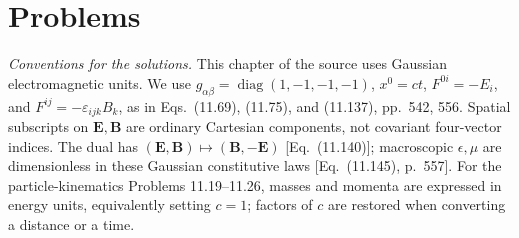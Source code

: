 
\section*{Problems}

\noindent\emph{Conventions for the solutions.} This chapter of the source
uses Gaussian electromagnetic units. We use
$g_{\alpha\beta}=\operatorname{diag}(1,-1,-1,-1)$,
$x^0=ct$, $F^{0i}=-E_i$, and $F^{ij}=-\varepsilon_{ijk}B_k$,
as in Eqs.~(11.69), (11.75), and (11.137), pp.~542, 556.
Spatial subscripts on $\mathbf E,\mathbf B$ are ordinary Cartesian
components, not covariant four-vector indices.  The dual has
$(\mathbf E,\mathbf B)\mapsto(\mathbf B,-\mathbf E)$
[Eq.~(11.140)]; macroscopic $\epsilon,\mu$ are dimensionless in
these Gaussian constitutive laws [Eq.~(11.145), p.~557].
For the particle-kinematics Problems 11.19--11.26, masses and momenta
are expressed in energy units, equivalently setting $c=1$; factors
of $c$ are restored when converting a distance or a time.

